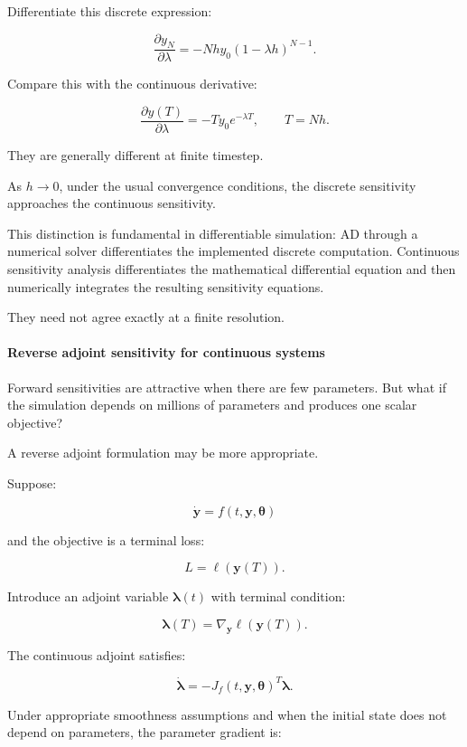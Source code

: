Differentiate this discrete expression:

\[
\boxed{ \frac{\partial y_N}{\partial\lambda} = -Nhy_0(1-\lambda h)^{N-1} }.
\]

Compare this with the continuous derivative:

\[
\frac{\partial y(T)}{\partial\lambda} = -Ty_0e^{-\lambda T}, \qquad T=Nh.
\]

They are generally different at finite timestep.

As \(h\to0\), under the usual convergence conditions, the discrete sensitivity approaches the continuous sensitivity.

This distinction is fundamental in differentiable simulation: AD through a numerical solver differentiates the implemented discrete computation. Continuous sensitivity analysis differentiates the mathematical differential equation and then numerically integrates the resulting sensitivity equations.

They need not agree exactly at a finite resolution.

\paragraph{Reverse adjoint sensitivity for continuous systems}\label{reverse-adjoint-sensitivity-for-continuous-systems}

Forward sensitivities are attractive when there are few parameters. But what if the simulation depends on millions of parameters and produces one scalar objective?

A reverse adjoint formulation may be more appropriate.

Suppose:

\[
\dot{\mathbf y}=f(t,\mathbf y,\boldsymbol\theta)
\]

and the objective is a terminal loss:

\[
L=\ell(\mathbf y(T)).
\]

Introduce an adjoint variable \(\boldsymbol\lambda(t)\) with terminal condition:

\[
\boxed{ \boldsymbol\lambda(T)= \nabla_{\mathbf y}\ell(\mathbf y(T)) }.
\]

The continuous adjoint satisfies:

\[
\boxed{ \dot{\boldsymbol\lambda} = -J_f(t,\mathbf y,\boldsymbol\theta)^T \boldsymbol\lambda }.
\]

Under appropriate smoothness assumptions and when the initial state does not depend on parameters, the parameter gradient is:

